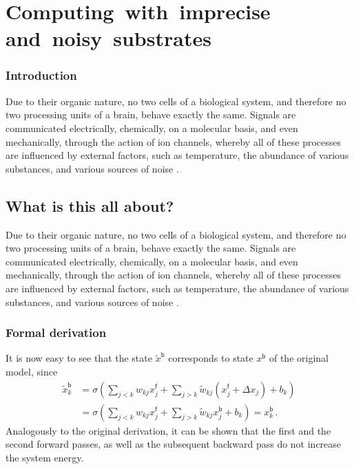\documentclass[b5paper,widemargins,twoside,printrev]{jb-thesis}
\begin{document}
 \part{Computing~with~imprecise and~noisy~substrates}

 \mbox{}
 \section*{Introduction}

 Due to their organic nature, no two cells of a biological system, and therefore no two processing units of a brain, behave exactly the same.
 Signals are communicated electrically, chemically, on a molecular basis, and even mechanically, through the action of ion channels, whereby all of these processes are influenced by external factors, such as temperature, the abundance of various substances, and various sources of noise \citep{shadlen1994noise}.

 \chapter{What is this all about?}

 Due to their organic nature, no two cells of a biological system, and therefore no two processing units of a brain, behave exactly the same.
 Signals are communicated electrically, chemically, on a molecular basis, and even mechanically, through the action of ion channels, whereby all of these processes are influenced by external factors, such as temperature, the abundance of various substances, and various sources of noise \citep{shadlen1994noise}.

 \section{Formal derivation}

 It is now easy to see that the state $\tilde{x}^\mathsf{b}$ corresponds to state $x^\mathsf{b}$ of the original model, since
 \begin{align}
     \tilde{x}^\mathsf{b}_k &= \sigma\left(\sum_{j<k} w_{kj} x^\mathsf{f}_j + \sum_{j>k} \tilde{w}_{kj} (x^\mathsf{f}_j + \Delta x_j) + b_k\right) \\
	&=  \sigma\left(\sum_{j<k} w_{kj} x^\mathsf{f}_j + \sum_{j>k} \tilde{w}_{kj} x^\mathsf{b}_j + b_k\right) = x^\mathsf{b}_k\,.
     \label{eqn:random1}
 \end{align}
 Analogously to the original derivation, it can be shown that the first and the second forward passes, as well as the subsequent backward pass do not increase the system energy.



 \printbibliography
\end{document}
